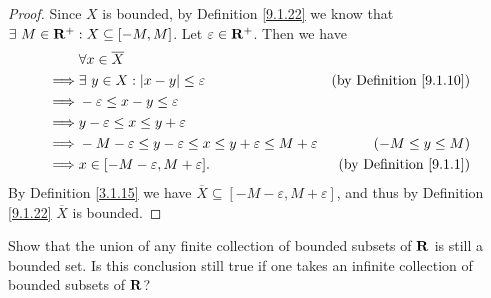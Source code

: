 \begin{proof}
    Since \(X\) is bounded, by Definition \ref{9.1.22} we know that \(\exists\ M \in \mathbf{R}^+ : X \subseteq [-M, M]\).
    Let \(\varepsilon \in \mathbf{R}^+\).
    Then we have
    \begin{align*}
                 & \forall x \in \overline{X}                                                                                                   \\
        \implies & \exists\ y \in X : \left\lvert x - y\right\rvert \leq \varepsilon                                        & \text{(by Definition \ref{9.1.10})} \\
        \implies & -\varepsilon \leq x - y \leq \varepsilon                                                                                     \\
        \implies & y - \varepsilon \leq x \leq y + \varepsilon                                                                                  \\
        \implies & -M - \varepsilon \leq y - \varepsilon \leq x \leq y + \varepsilon \leq M + \varepsilon & (-M \leq y \leq M)                  \\
        \implies & x \in [-M - \varepsilon, M + \varepsilon].                                             & \text{(by Definition \ref{9.1.1})}
    \end{align*}
    By Definition \ref{3.1.15} we have \(\overline{X} \subseteq [-M - \varepsilon, M + \varepsilon]\), and thus by Definition \ref{9.1.22} \(\overline{X}\) is bounded.
\end{proof}

\begin{exercise}\label{ex 9.1.12}
    Show that the union of any finite collection of bounded subsets of \(\mathbf{R}\) is still a bounded set.
    Is this conclusion still true if one takes an infinite collection of bounded subsets of \(\mathbf{R}\)?
\end{exercise}

